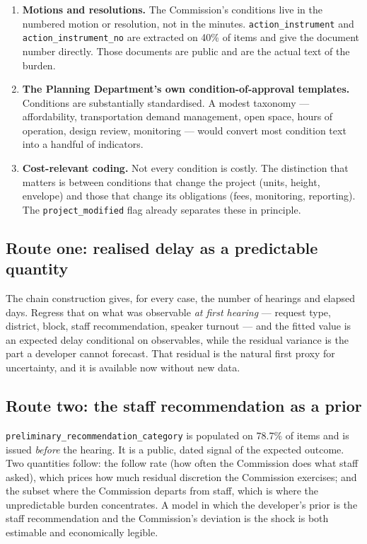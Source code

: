 \documentclass[11pt]{article}
\begin{document}
\begin{enumerate}
\item \textbf{Motions and resolutions.} The Commission's conditions live in the numbered motion
or resolution, not in the minutes. \texttt{action\_instrument} and
\texttt{action\_instrument\_no} are extracted on 40\% of items and give the document number
directly. Those documents are public and are the actual text of the burden.
\item \textbf{The Planning Department's own condition-of-approval templates.} Conditions are
substantially standardised. A modest taxonomy --- affordability, transportation demand
management, open space, hours of operation, design review, monitoring --- would convert most
condition text into a handful of indicators.
\item \textbf{Cost-relevant coding.} Not every condition is costly. The distinction that
matters is between conditions that change the project (units, height, envelope) and those that
change its obligations (fees, monitoring, reporting). The \texttt{project\_modified} flag
already separates these in principle.
\end{enumerate}

\subsection{Route one: realised delay as a predictable quantity}

The chain construction gives, for every case, the number of hearings and elapsed days. Regress
that on what was observable \emph{at first hearing} --- request type, district, block, staff
recommendation, speaker turnout --- and the fitted value is an expected delay conditional on
observables, while the residual variance is the part a developer cannot forecast. That
residual is the natural first proxy for uncertainty, and it is available now without new data.

\subsection{Route two: the staff recommendation as a prior}

\texttt{preliminary\_recommendation\_category} is populated on 78.7\% of items and is issued
\emph{before} the hearing. It is a public, dated signal of the expected outcome. Two
quantities follow: the follow rate (how often the Commission does what staff asked), which
prices how much residual discretion the Commission exercises; and the subset where the
Commission departs from staff, which is where the unpredictable burden concentrates. A model
in which the developer's prior is the staff recommendation and the Commission's deviation is
the shock is both estimable and economically legible.
\end{document}
